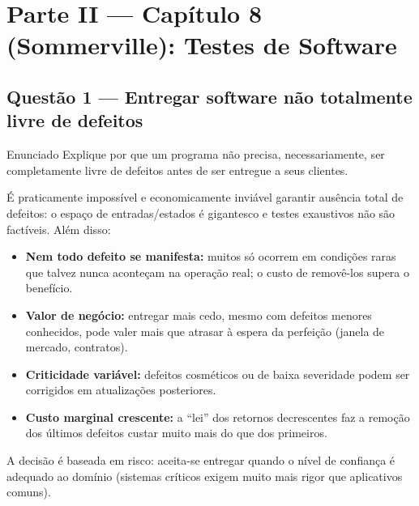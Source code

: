 \documentclass[11pt,a4paper]{article}
\begin{document}
\section{Parte II — Capítulo 8 (Sommerville): Testes de Software}

\subsection*{Questão 1 — Entregar software não totalmente livre de defeitos}
\begin{questao}{Enunciado}
Explique por que um programa não precisa, necessariamente, ser completamente
livre de defeitos antes de ser entregue a seus clientes.
\end{questao}
\begin{resposta}
É praticamente impossível e economicamente inviável garantir ausência total de
defeitos: o espaço de entradas/estados é gigantesco e testes exaustivos não são
factíveis. Além disso:
\begin{itemize}[nosep]
  \item \textbf{Nem todo defeito se manifesta:} muitos só ocorrem em condições
        raras que talvez nunca aconteçam na operação real; o custo de removê-los
        supera o benefício.
  \item \textbf{Valor de negócio:} entregar mais cedo, mesmo com defeitos menores
        conhecidos, pode valer mais que atrasar à espera da perfeição (janela de
        mercado, contratos).
  \item \textbf{Criticidade variável:} defeitos cosméticos ou de baixa severidade
        podem ser corrigidos em atualizações posteriores.
  \item \textbf{Custo marginal crescente:} a “lei” dos retornos decrescentes faz
        a remoção dos últimos defeitos custar muito mais do que dos primeiros.
\end{itemize}
A decisão é baseada em risco: aceita-se entregar quando o nível de confiança é
adequado ao domínio (sistemas críticos exigem muito mais rigor que aplicativos
comuns).
\end{resposta}

\end{document}
